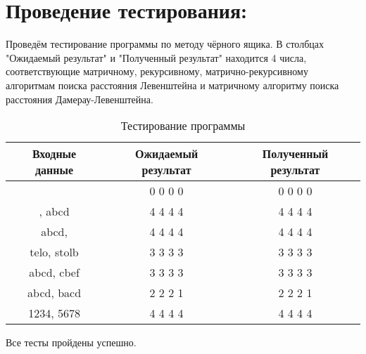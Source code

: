 \section{Проведение тестирования:}
Проведём тестирование программы по методу чёрного ящика. В столбцах "Ожидаемый результат" и "Полученный результат" находится 4 числа, соответствующие матричному, рекурсивному, матрично-рекурсивному алгоритмам поиска расстояния Левенштейна и матричному алгоритму поиска расстояния Дамерау-Левенштейна.
\begin{table}[H]
	\caption{Тестирование программы}
	\begin{tabular}{|c|c|c|}
		\hline
		\textbf{Входные данные} & \textbf{Ожидаемый результат} & \textbf{Полученный результат} \\ \hline
		\text{,}                  & 0 0 0 0                      & 0 0 0 0                       \\ \hline
		, abcd               & 4 4 4 4                      & 4 4 4 4                       \\ \hline
		abcd,               & 4 4 4 4                      & 4 4 4 4                       \\ \hline
		telo, stolb          & 3 3 3 3                      & 3 3 3 3                       \\ \hline
		abcd, cbef           & 3 3 3 3                      & 3 3 3 3                       \\ \hline
		abcd, bacd          & 2 2 2 1                      & 2 2 2 1                       \\ \hline
		1234, 5678           & 4 4 4 4                      & 4 4 4 4                       \\ \hline
	\end{tabular}
\end{table}
Все тесты пройдены успешно.
